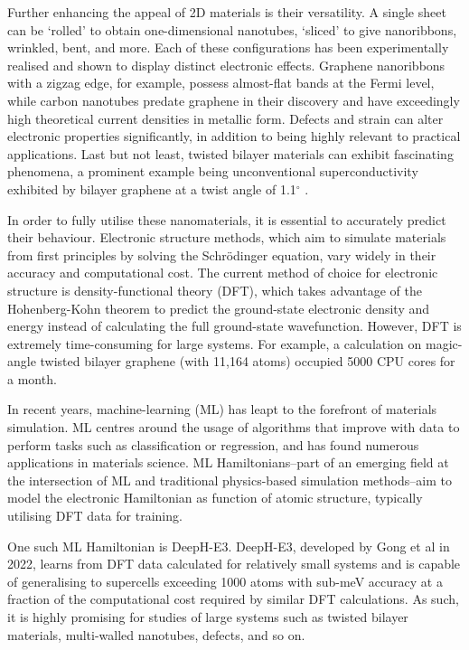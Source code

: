 \documentclass[11pt,a4paper,twoside]{report}  %
\numberwithin{equation}{section}					%
\numberwithin{figure}{section}						%
\begin{document}
Further enhancing the appeal of 2D materials is their versatility. A single sheet can be `rolled' to obtain one-dimensional nanotubes, `sliced' to give nanoribbons, wrinkled, bent, and more. Each of these configurations has been experimentally realised and shown to display distinct electronic effects. Graphene nanoribbons with a zigzag edge, for example, possess almost-flat bands at the Fermi level, while carbon nanotubes predate graphene in their discovery and have exceedingly high theoretical current densities in metallic form\autocites{nakadaEdgeStateGraphene1996,hongFlexibleApproachMobility2007}. Defects and strain can alter electronic properties significantly, in addition to being highly relevant to practical applications\autocites{changOrbitalAnalysisElectronic2013, joEffectsStrainDefects2024}. Last but not least, twisted bilayer materials can exhibit fascinating phenomena, a prominent example being unconventional superconductivity exhibited by bilayer graphene at a twist angle of 1.1$^\circ$ \autocite{caoUnconventionalSuperconductivityMagicangle2018}.

In order to fully utilise these nanomaterials, it is essential to accurately predict their behaviour. Electronic structure methods, which aim to simulate materials from first principles by solving the Schr\"{o}dinger equation, vary widely in their accuracy and computational cost. The current method of choice for electronic structure is density-functional theory (DFT), which takes advantage of the Hohenberg-Kohn theorem to predict the ground-state electronic density and energy instead of calculating the full ground-state wavefunction\autocite{hohenbergInhomogeneousElectronGas1964}. However, DFT is extremely time-consuming for large systems. For example, a calculation on magic-angle twisted bilayer graphene (with 11,164 atoms) occupied 5000 CPU cores for a month\autocite{lucignanoCrucialRoleAtomic2019}. 

In recent years, machine-learning (ML) has leapt to the forefront of materials simulation. ML centres around the usage of algorithms that improve with data to perform tasks such as classification or regression, and has found numerous applications in materials science\autocite{ruppGuestEditorialSpecial2018}. ML Hamiltonians--part of an emerging field at the intersection of ML and traditional physics-based simulation methods--aim to model the electronic Hamiltonian as function of atomic structure, typically utilising DFT data for training.

One such ML Hamiltonian is DeepH-E3. DeepH-E3, developed by Gong et al in 2022, learns from DFT data calculated for relatively small systems and is capable of generalising to supercells exceeding 1000 atoms with sub-meV accuracy at a fraction of the computational cost required by similar DFT calculations\autocite{gongGeneralFrameworkE3equivariant2023}. As such, it is highly promising for studies of large systems such as twisted bilayer materials, multi-walled nanotubes, defects, and so on.
\end{document}
